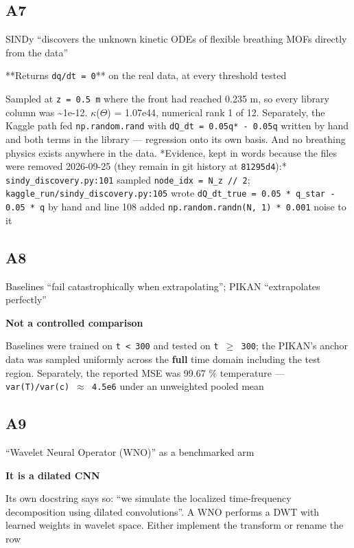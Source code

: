 \documentclass[10pt]{article}
\begin{document}
\subsection*{A7}\label{led:A7}
\begin{description}[leftmargin=0pt,itemsep=1pt]
\item[Claim withdrawn.] SINDy ``discovers the unknown kinetic ODEs of flexible breathing MOFs directly from the data''
\item[Replaced with.] **Returns \texttt{dq/dt = 0}** on the real data, at every threshold tested
\item[Why it was wrong.] Sampled at \texttt{z = 0.5 m} where the front had reached 0.235 m, so every library column was \textasciitilde{}1e-12. $\kappa$($\Theta$) = 1.07e44, numerical rank 1 of 12. Separately, the Kaggle path fed \texttt{np.random.rand} with \texttt{dQ\_dt = 0.05q* - 0.05q} written by hand and both terms in the library --- regression onto its own basis. And no breathing physics exists anywhere in the data. *Evidence, kept in words because the files were removed 2026-09-25 (they remain in git history at \texttt{81295d4}):* \texttt{sindy\_discovery.py:101} sampled \texttt{node\_idx = N\_z // 2}; \texttt{kaggle\_run/sindy\_discovery.py:105} wrote \texttt{dQ\_dt\_true = 0.05 * q\_star - 0.05 * q} by hand and line 108 added \texttt{np.random.randn(N, 1) * 0.001} noise to it
\end{description}
\subsection*{A8}\label{led:A8}
\begin{description}[leftmargin=0pt,itemsep=1pt]
\item[Claim withdrawn.] Baselines ``fail catastrophically when extrapolating''; PIKAN ``extrapolates perfectly''
\item[Replaced with.] \textbf{Not a controlled comparison}
\item[Why it was wrong.] Baselines were trained on \texttt{t < 300} and tested on \texttt{t $\geq$ 300}; the PIKAN's anchor data was sampled uniformly across the \textbf{full} time domain including the test region. Separately, the reported MSE was 99.67 \% temperature --- \texttt{var(T)/var(c) $\approx$ 4.5e6} under an unweighted pooled mean
\end{description}
\subsection*{A9}\label{led:A9}
\begin{description}[leftmargin=0pt,itemsep=1pt]
\item[Claim withdrawn.] ``Wavelet Neural Operator (WNO)'' as a benchmarked arm
\item[Replaced with.] \textbf{It is a dilated CNN}
\item[Why it was wrong.] Its own docstring says so: ``we simulate the localized time-frequency decomposition using dilated convolutions''. A WNO performs a DWT with learned weights in wavelet space. Either implement the transform or rename the row
\end{description}
\end{document}
